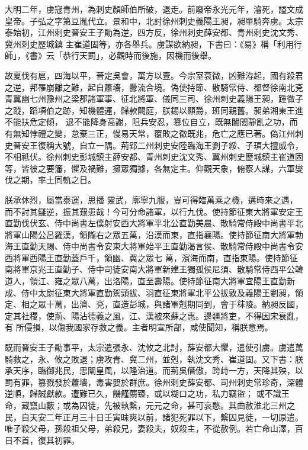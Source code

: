 \begin{pinyinscope}
 大明二年，虜寇青州，為刺史顏師伯所破，退走。前廢帝永光元年，濬死，謚文成皇帝。子弘之字第豆胤代立。景和中，北討徐州刺史義陽王昶，昶單騎奔虜。太宗泰始初，江州刺史晉安王子勛為逆，四方反，徐州刺史薛安都、青州刺史沈文秀、冀州刺史歷城鎮
 主崔道固等，亦各舉兵。虜謀欲納昶，下書曰：《易》稱「利用行師」，《書》云「恭行天罰」，必觀時而後施，因機而後舉。



 故夏伐有扈，四海以平，晉定吳會，萬方以壹。今宗室衰微，凶難洊起，國有殺君之逆，邦罹崩離之難，起自蕭墻，釁流合境。偽使持節、散騎常侍、都督徐南北兗青冀幽七州豫州之梁郡諸軍事、征北將軍、儀同三司、徐州刺史義陽王昶，踵微子之蹤，蹈項伯之跡，知機體運，歸款闕庭，朕錫以顯爵，班同親舊。昶弟湘東王進不能扶危定傾，
 退不能降身高謝，阻兵安忍，篡位自立，既無闔閭靜亂之功，而有無知悖禮之變，怠棄三正，慢易天常，覆敗之徵既兆，危亡之應已著。偽江州刺史晉安王復稱大號，自立一隅。荊郢二州刺史安陸臨海王劉子綏、子頊大擅威令，不相祗伏。徐州刺史彭城鎮主薛安都、青州刺史沈文秀、冀州刺史歷城鎮主崔道固等，皆彼之要籓，懼及禍難，擁眾獨據，各無定主。仰觀天象，俯察人謀，六軍燮伐之期，率土同軌之日。



 朕承休烈，屬當泰運，思播
 靈武，廓寧九服，豈可得臨萬乘之機，遘時來之遇，而不討其讎逆，振其艱患哉！今可分命諸軍，以行九伐。使持節征東大將軍安定王直勤伐伏玄、侍中尚書左僕射安西大將軍平北公直勤美晨、散騎常侍殿中尚書平北將軍山陽公呂羅漢，領隴右之眾五萬，沿漢而東，直指襄陽。使持節征南大將軍勃海王直勤天賜、侍中尚書令安東大將軍始平王直勤渴言侯、散騎常侍殿中尚書令安西將軍西陽王直勤蓋戶千，領幽、冀之眾七
 萬，濱海而南，直指東陽。使持節征南將軍京兆王直勤子、侍中司徒安南大將軍新建王獨孤侯尼須、散騎常侍西平公韓道人，領江、雍之眾八萬，出洛陽，直至壽陽。使持節征南大將軍宜陽王直勤新成、侍中太尉征東大將軍直勤駕頭拔、羽直征東將軍北平公拔敦及義陽王劉昶，領定、相之眾十萬，出濟、兗，直造彭城，與諸軍剋期同到，會于秣陵。納昶反國，定其社稷，使荊、陽沾德義之風，江、漢被來蘇之惠。邊疆將吏，不得因宋衰亂，有
 所侵損，以傷我國家存救之義。主者明宣所部，咸使聞知，稱朕意焉。



 既而晉安王子勛事平，太宗遣張永、沈攸之北討，薛安都大懼，遣使引虜。虜遣萬騎救之，永、攸之敗退；虜攻青、冀二州，並剋，執沈文秀、崔道固。又下書：朕承天序，臨御兆民，思闡皇風，以隆治道。而荊吳僭傲，跨歭一方，天降其殃，以罰有罪，篡戮發於蕭墻，毒害嬰於群庶。徐州刺史薛安都、司州刺史常珍奇，深體逆順，歸誠獻款。遭難已久，饑饉薦臻，或以糊口之功，私力竊盜；
 或不識王命，藏竄山藪；或為囚徒，先被執繫，元元之命，甚可哀愍。其曲赦淮北三州之民，自天安二年正月三十日壬寅昧爽以前，諸犯死罪以下，繫囚見徒，一切原遣。唯子殺父母，孫殺祖父母，弟殺兄，妻殺夫，奴殺主，不從赦例。若亡命山澤，百日不首，復其初罪。




\end{pinyinscope}
